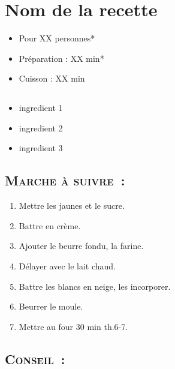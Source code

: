 \section{Nom de la recette}

\begin{itemize}
\item Pour XX personnes*		%
\item Préparation : XX min*		%
\item Cuisson : XX min			%
\end{itemize}

\subsection*{}

\begin{itemize}
\item ingredient 1
\item ingredient 2
\item ingredient 3
\end{itemize}


\subsection*{\textsc{Marche à suivre~:}}

\begin{enumerate}
\item Mettre les jaunes et le sucre.

\item Battre en cr\`eme.

\item Ajouter le beurre fondu, la farine.

\item D\'elayer avec le lait chaud.

\item Battre les blancs en neige, les incorporer.

\item Beurrer le moule.

\item Mettre au four 30 min th.6-7.
\end{enumerate}


\subsection*{\textsc{Conseil~:}}


